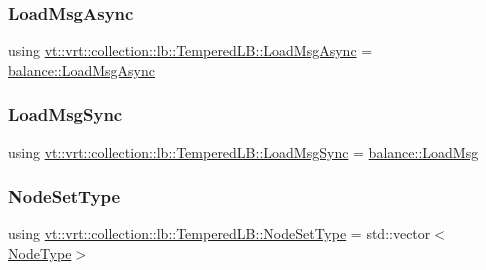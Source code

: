 \subsubsection{\texorpdfstring{Load\+Msg\+Async}{LoadMsgAsync}}
{\footnotesize\ttfamily using \hyperlink{structvt_1_1vrt_1_1collection_1_1lb_1_1_tempered_l_b_a38d9ad7e92612cdbdf564b6f49b516a7}{vt\+::vrt\+::collection\+::lb\+::\+Tempered\+L\+B\+::\+Load\+Msg\+Async} =  \hyperlink{structvt_1_1vrt_1_1collection_1_1balance_1_1_load_msg_async}{balance\+::\+Load\+Msg\+Async}}

\mbox{\label{structvt_1_1vrt_1_1collection_1_1lb_1_1_tempered_l_b_aa46eb8cbc4c505f35b970f75e38b5e0d}} 
\subsubsection{\texorpdfstring{Load\+Msg\+Sync}{LoadMsgSync}}
{\footnotesize\ttfamily using \hyperlink{structvt_1_1vrt_1_1collection_1_1lb_1_1_tempered_l_b_aa46eb8cbc4c505f35b970f75e38b5e0d}{vt\+::vrt\+::collection\+::lb\+::\+Tempered\+L\+B\+::\+Load\+Msg\+Sync} =  \hyperlink{structvt_1_1vrt_1_1collection_1_1balance_1_1_load_msg}{balance\+::\+Load\+Msg}}

\mbox{\label{structvt_1_1vrt_1_1collection_1_1lb_1_1_tempered_l_b_aa18a0edaf10119e307e7209371caa673}} 
\subsubsection{\texorpdfstring{Node\+Set\+Type}{NodeSetType}}
{\footnotesize\ttfamily using \hyperlink{structvt_1_1vrt_1_1collection_1_1lb_1_1_tempered_l_b_aa18a0edaf10119e307e7209371caa673}{vt\+::vrt\+::collection\+::lb\+::\+Tempered\+L\+B\+::\+Node\+Set\+Type} =  std\+::vector$<$\hyperlink{namespacevt_a866da9d0efc19c0a1ce79e9e492f47e2}{Node\+Type}$>$}

